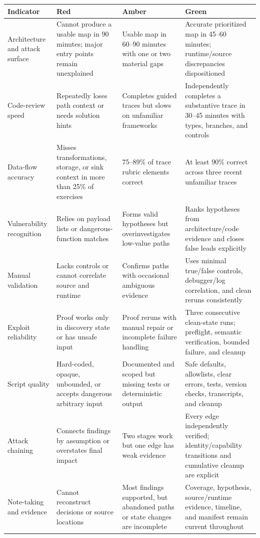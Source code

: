 \documentclass[11pt]{article}
\begin{document}
\small
\begin{longtable}{@{}L{0.19\textwidth}L{0.24\textwidth}L{0.24\textwidth}L{0.24\textwidth}@{}}
\toprule
\textbf{Indicator} & \textbf{Red} & \textbf{Amber} & \textbf{Green} \\
\midrule
\endhead
Architecture and attack surface & Cannot produce a usable map in 90 minutes; major entry points remain unexplained & Usable map in 60--90 minutes with one or two material gaps & Accurate prioritized map in 45--60 minutes; runtime/source discrepancies dispositioned \\
Code-review speed & Repeatedly loses path context or needs solution hints & Completes guided traces but slows on unfamiliar frameworks & Independently completes a substantive trace in 30--45 minutes with types, branches, and controls \\
Data-flow accuracy & Misses transformations, storage, or sink context in more than 25\% of exercises & 75--89\% of trace rubric elements correct & At least 90\% correct across three recent unfamiliar traces \\
Vulnerability recognition & Relies on payload lists or dangerous-function matches & Forms valid hypotheses but overinvestigates low-value paths & Ranks hypotheses from architecture/code evidence and closes false leads explicitly \\
Manual validation & Lacks controls or cannot correlate source and runtime & Confirms paths with occasional ambiguous evidence & Uses minimal true/false controls, debugger/log correlation, and clean reruns consistently \\
Exploit reliability & Proof works only in discovery state or has unsafe input & Proof reruns with manual repair or incomplete failure handling & Three consecutive clean-state runs; preflight, semantic verification, bounded failure, and cleanup \\
Script quality & Hard-coded, opaque, unbounded, or accepts dangerous arbitrary input & Documented and scoped but missing tests or deterministic output & Safe defaults, allowlists, clear errors, tests, version checks, transcripts, and cleanup \\
Attack chaining & Connects findings by assumption or overstates final impact & Two stages work but one edge has weak evidence & Every edge independently verified; identity/capability transitions and cumulative cleanup are explicit \\
Note-taking and evidence & Cannot reconstruct decisions or source locations & Most findings supported, but abandoned paths or state changes are incomplete & Coverage, hypothesis, source/runtime evidence, timeline, and manifest remain current throughout \\

\end{longtable}
\end{document}

